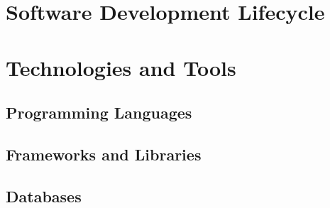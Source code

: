 
\section{Software Development Lifecycle}
    
\section{Technologies and Tools}
    \subsection{Programming Languages}
    \subsection{Frameworks and Libraries}
    \subsection{Databases}
